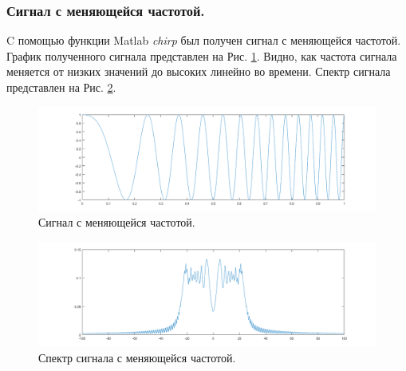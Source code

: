 \documentclass[a4paper,14pt]{extarticle}
\begin{document}
\subsubsection{Сигнал с меняющейся частотой.}
C помощью функции Matlab \textit{chirp} был получен сигнал с меняющейся частотой. График полученного сигнала представлен на Рис. \ref{chirp}. Видно, как частота  сигнала меняется от низких значений до высоких линейно во времени. Спектр сигнала представлен на Рис. \ref{chirp_}.
\begin{figure}[H]
\centering
\includegraphics[scale=0.5]{pics/1chirp.png}
\caption{Сигнал с меняющейся частотой.}
\label{chirp}
\end{figure}
\begin{figure}[H]
\centering
\includegraphics[scale=0.5]{pics/1chirp_spec.png}
\caption{Спектр сигнала с меняющейся частотой.}
\label{chirp_}
\end{figure}
\end{document}
